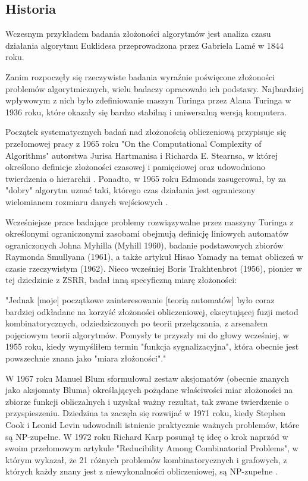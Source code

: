 	\subsection{Historia}

Wczesnym przykładem badania złożoności algorytmów jest analiza czasu działania algorytmu Euklidesa przeprowadzona przez Gabriela Lamé w 1844 roku.

Zanim rozpoczęły się rzeczywiste badania wyraźnie poświęcone złożoności problemów algorytmicznych, wielu badaczy opracowało ich podstawy. Najbardziej wpływowym z nich było zdefiniowanie maszyn Turinga przez Alana Turinga w 1936 roku, które okazały się bardzo stabilną i uniwersalną wersją komputera.

Początek systematycznych badań nad złożonością obliczeniową przypisuje się przełomowej pracy z 1965 roku "On the Computational Complexity of Algorithms" autorstwa Jurisa Hartmanisa i Richarda E. Stearnsa, w której określono definicje złożoności czasowej i pamięciowej oraz udowodniono twierdzenia o hierarchii \cite{FortnowH03}. Ponadto, w 1965 roku Edmonds zasugerował, by za "dobry" algorytm uznać taki, którego czas działania jest ograniczony wielomianem rozmiaru danych wejściowych \cite{Karp86}.

Wcześniejsze prace badające problemy rozwiązywalne przez maszyny Turinga z określonymi ograniczonymi zasobami obejmują \cite{FortnowH03} definicję liniowych automatów ograniczonych Johna Myhilla (Myhill 1960), badanie podstawowych zbiorów Raymonda Smullyana (1961), a także artykuł Hisao Yamady \cite{Yamada62a} na temat obliczeń w czasie rzeczywistym (1962). Nieco wcześniej Boris Trakhtenbrot (1956), pionier w tej dziedzinie z ZSRR, badał inną specyficzną miarę złożoności:

"Jednak [moje] początkowe zainteresowanie [teorią automatów] było coraz bardziej odkładane na korzyść złożoności obliczeniowej, ekscytującej fuzji metod kombinatorycznych, odziedziczonych po teorii przełączania, z arsenałem pojęciowym teorii algorytmów. Pomysły te przyszły mi do głowy wcześniej, w 1955 roku, kiedy wymyśliłem termin "funkcja sygnalizacyjna", która obecnie jest powszechnie znana jako "miara złożoności"\cite{Trakhtenbrot08}."

W 1967 roku Manuel Blum sformułował zestaw aksjomatów (obecnie znanych jako aksjomaty Bluma) określających pożądane właściwości miar złożoności na zbiorze funkcji obliczalnych i uzyskał ważny rezultat, tak zwane twierdzenie o przyspieszeniu. Dziedzina ta zaczęła się rozwijać w 1971 roku, kiedy Stephen Cook i Leonid Levin udowodnili istnienie praktycznie ważnych problemów, które są NP-zupełne. W 1972 roku Richard Karp posunął tę ideę o krok naprzód w swoim przełomowym artykule "Reducibility Among Combinatorial Problems", w którym wykazał, że 21 różnych problemów kombinatorycznych i grafowych, z których każdy znany jest z niewykonalności obliczeniowej, są NP-zupełne \cite{Karp86}.


